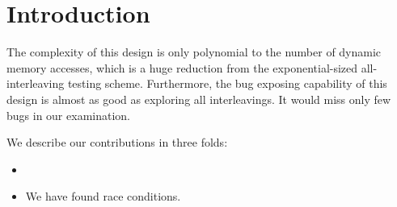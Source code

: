 \section{Introduction}
\label{s:intro}

%
The complexity of this design is only polynomial to the number of
dynamic memory accesses, which is a huge reduction from the
exponential-sized all-interleaving testing scheme.  Furthermore, the
bug exposing capability of this design is almost as good as exploring
all interleavings. It would miss only few bugs in our examination.

We describe our contributions in three folds:

\begin{itemize}
  \item 
  \item We have found \totalbugs race conditions.
\end{itemize}

